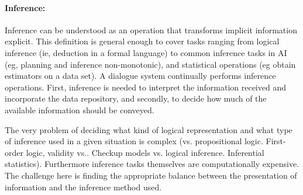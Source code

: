 
\paragraph{Inference:} Inference can be understood as an operation that
transforms implicit information explicit. This definition is general enough to
cover tasks ranging from logical inference (ie, deduction in a formal language)
to common inference tasks in AI (eg, planning and inference non-monotonic), and
statistical operations (eg obtain estimators on a data set). A dialogue system
continually performs inference operations. First, inference is needed to
interpret the information received and incorporate the data repository, and
secondly, to decide how much of the available information should be conveyed.


The very problem of deciding what kind of logical representation and what type
of inference used in a given situation is complex (vs. propositional logic.
First-order logic, validity vs.. Checkup models vs. logical inference.
Inferential statistics). Furthermore inference tasks themselves are
computationally expensive. The challenge here is finding the appropriate balance
between the presentation of information and the inference method used.


